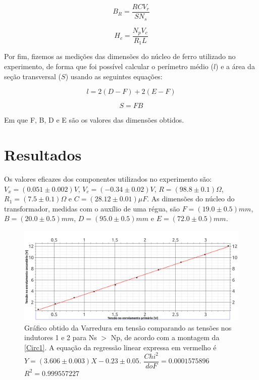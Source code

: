 \documentclass[11pt,a4paper]{article}
\begin{document}
	\begin{equation}
	    B_R = \dfrac{RCV_r}{SN_s}
	    \label{CampoR}
	\end{equation}
	
	\begin{equation}
	    H_c = \dfrac{N_p V_c}{R_1 L}
	    \label{ForcaC}
	\end{equation}
    
	Por fim, fizemos as medições das dimensões do núcleo de ferro utilizado no experimento, de forma que foi possível calcular o perímetro médio ($l$) e a área da seção transversal ($S$) usando as seguintes equações:
    
    \begin{equation}
	    l = 2(D - F) + 2(E-F)
	    \label{PerMedio}
	\end{equation}
	
    \begin{equation}
	    S = FB
	    \label{Area}
	\end{equation}
	
	Em que F, B, D e E são os valores das dimensões obtidos.
%
%
\section{Resultados}
    Os valores eficazes dos componentes utilizados no experimento são: $V_x = (0.051 \pm 0.002) V$, $V_c = (-0.34 \pm 0.02) V$, $R = (98.8 \pm 0.1)\Omega$, $R_1 = (7.5 \pm 0.1) \Omega$ e $C = (28.12 \pm 0.01) \mu F$. As dimensões do núcleo do transformador, medidas com o auxílio de uma régua, são $F = (19.0 \pm 0.5)mm$, $B = (20.0 \pm 0.5)mm$, $D = (95.0 \pm 0.5)mm$ e $E = (72.0 \pm 0.5)mm$.
    
    \begin{figure}[!htb]
    \centering
    \includegraphics[scale=0.4]{Varredura2A.png}
    \caption{Gráfico obtido da Varredura em tensão comparando as tensões nos indutores 1 e 2 para Ns $>$ Np, de acordo com a montagem da \cref{Circ1}. A equação da regressão linear expressa em vermelho é $Y = (3.606 \pm 0.003)X - 0.23 \pm 0.05$. $\dfrac{Chi^2}{doF} = 0.0001575896$ $R^2 = 0.999557227$}
    \label{Varredura2A}
    \end{figure}
    
\end{document}
